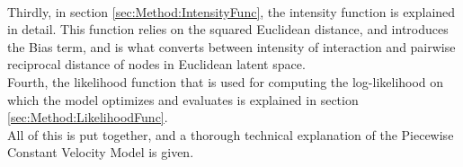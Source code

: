 \\
Thirdly, in section \ref{sec:Method:IntensityFunc}, the intensity function is explained in detail.
This function relies on the squared Euclidean distance, and introduces the Bias term, and is what converts between intensity of interaction and pairwise reciprocal distance of nodes in Euclidean latent space.
\\
Fourth, the likelihood function that is used for computing the log-likelihood on which the model optimizes and evaluates is explained in section \ref{sec:Method:LikelihoodFunc}.
\\
All of this is put together, and a thorough technical explanation of the Piecewise Constant Velocity Model is given.
